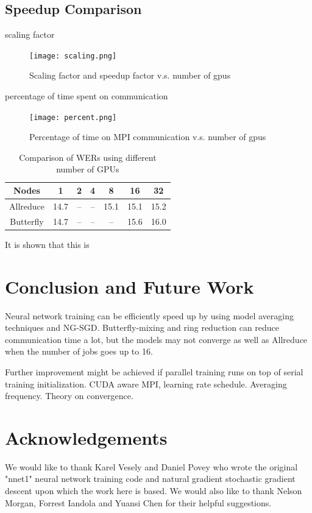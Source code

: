 \documentclass{article}
\begin{document}
\subsection{Speedup Comparison}
scaling factor
\begin{figure}[htb]
  \centering
  \texttt{[image: scaling.png]}
  \caption{Scaling factor and speedup factor v.s. number of gpus}
  \label{fig:scaling}
\end{figure}

percentage of time spent on communication
\begin{figure}[htb]
  \centering
  \texttt{[image: percent.png]}
  \caption{Percentage of time on MPI communication v.s. number of gpus}
  \label{fig:percent}
\end{figure}

\begin{table}
  \centering
  \begin{tabular}{c|c|c|c|c|c|c}
    \hline
     Nodes  & 1    & 2    & 4    & 8    & 16 & 32\\
    \hline
Allreduce &    14.7 & -- & -- & 15.1 & 15.1   & 15.2\\
    \hline
Butterfly &    14.7 & -- & -- & --   & 15.6   & 16.0\\
    \hline
  \end{tabular}
  \caption{Comparison of WERs using different number of GPUs }
  \label{tab:wer}
\end{table}

It is shown that this is

\section{Conclusion and Future Work}
Neural network training can be efficiently speed up by using model averaging techniques and NG-SGD. 
Butterfly-mixing and ring reduction can reduce communication time a lot, but the models may not converge as well as 
Allreduce when the number of jobs goes up to 16.

Further improvement might be achieved if parallel training runs on top of serial training initialization.
CUDA aware MPI, learning rate schedule. Averaging frequency. Theory on convergence.


\section{Acknowledgements}
We would like to thank Karel Vesely and Daniel Povey who wrote the original "nnet1" neural network training code
and natural gradient stochastic gradient descent upon which the work here is based. We would also like to thank Nelson 
Morgan, Forrest Iandola and Yuansi Chen for their helpful suggestions. 
\end{document}
